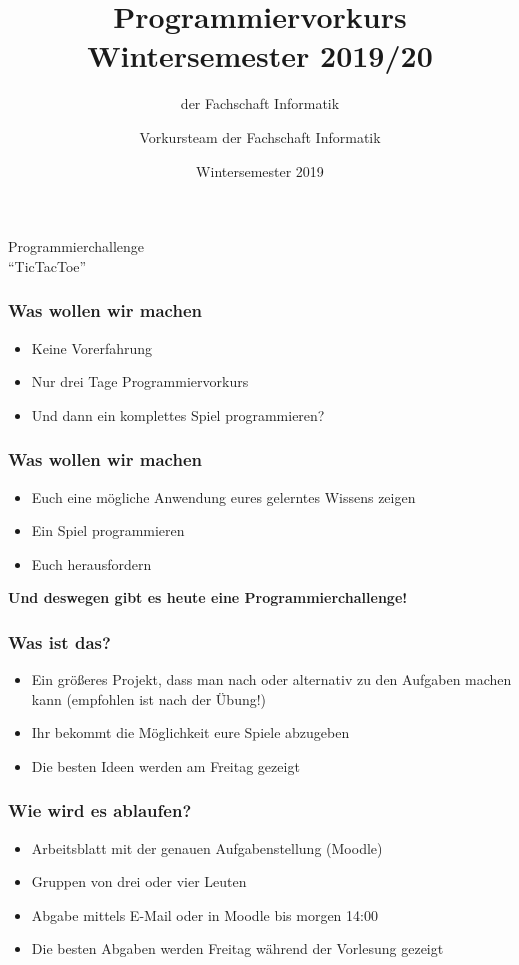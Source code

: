 \documentclass[accentcolor=tud3c,colorbacktitle,inverttitle,landscape,german,presentation,t]{tudbeamer}
\title[Programmiervorkurs]{Programmiervorkurs Wintersemester 2019/20}
\subtitle{{\small der Fachschaft Informatik}}
\author{Vorkursteam der Fachschaft Informatik}
\institute{TU Darmstadt}
\date{Wintersemester 2019}
\begin{document}
\begin{titleframe}
	\begin{center}
		\vspace{2cm}
		{\huge Programmierchallenge \\ "`TicTacToe"'}
	\end{center}
\end{titleframe}


\begin{frame}
	\frametitle{Was wollen wir machen}
		\begin{itemize}
			\item Keine Vorerfahrung
			\item Nur drei Tage Programmiervorkurs
			\item Und dann ein komplettes Spiel programmieren?
		\end{itemize}
\end{frame}


\begin{frame}
	\frametitle{Was wollen wir machen}
		\begin{itemize}
			\item Euch eine mögliche Anwendung eures gelerntes Wissens zeigen
			\item Ein Spiel programmieren
			\item Euch herausfordern
		\end{itemize}
		\vspace{6mm}
	\begin{center}
	 \textbf{\huge Und deswegen gibt es heute eine Programmierchallenge!}	
	\end{center}
	
\end{frame}



\begin{frame}
	\frametitle{Was ist das?}
	\begin{itemize}
		\item Ein größeres Projekt, dass man nach oder alternativ zu den Aufgaben machen kann (empfohlen ist nach der Übung!)
		\item Ihr bekommt die Möglichkeit eure Spiele abzugeben
		\item Die besten Ideen werden am Freitag gezeigt
	\end{itemize}
\end{frame}

\begin{frame}
	\frametitle{Wie wird es ablaufen?}
	\begin{itemize}
		\item Arbeitsblatt mit der genauen Aufgabenstellung (Moodle)
		\item Gruppen von drei oder vier Leuten
		\item Abgabe mittels E-Mail oder in Moodle bis morgen 14:00
		\item Die besten Abgaben werden Freitag während der Vorlesung gezeigt
	\end{itemize}
\end{frame}
\end{document}
